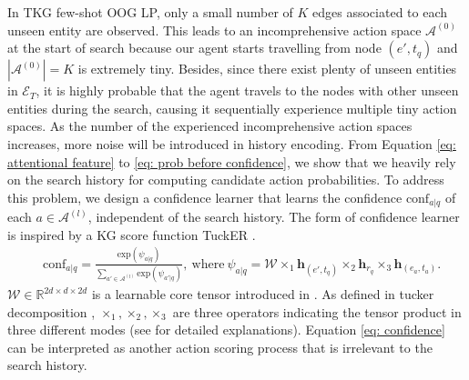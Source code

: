 \documentclass[runningheads]{llncs}
\begin{document}
In TKG few-shot OOG LP, only a small number of $K$ edges associated to each unseen entity are observed. 
This leads to an incomprehensive action space $\mathcal{A}^{(0)}$ at the start of search because our agent 
starts travelling from node $(e', t_q)$ and $|\mathcal{A}^{(0)}|=K$ is extremely tiny. 
Besides, since there exist plenty of unseen entities in $\mathcal{E}_T$, it is highly probable that the agent 
travels to the nodes with other unseen entities during the search, causing it sequentially experience multiple tiny action spaces. As the number of the experienced incomprehensive action spaces increases, more noise will be introduced in history encoding.
From Equation \ref{eq: attentional feature} to \ref{eq: prob before confidence}, 
we show that we heavily rely on the search history for computing candidate action probabilities.
To address this problem, we design a confidence learner that learns the confidence $\text{conf}_{a|q}$ of each
$a \in \mathcal{A}^{(l)}$, independent of the search history. The form of confidence learner is inspired by a KG score 
function TuckER \cite{DBLP:conf/emnlp/BalazevicAH19}.
\begin{equation}
\label{eq: confidence}
\begin{aligned}
        &\text{conf}_{a|q} = \frac{\text{exp}(\psi_{a|q})}{\sum_{a' \in \mathcal{A}^{(l)}} \text{exp}(\psi_{a'|q})}, \ \text{where}\ \psi_{a|q} = \mathcal{W} \times_1 \mathbf{h}_{(e', t_q)} \times_2 \mathbf{h}_{r_q} \times_3 \mathbf{h}_{(e_a, t_a)}.
\end{aligned}
\end{equation}
$\mathcal{W} \in \mathbb{R}^{2d \times d \times 2d}$ is a learnable core tensor introduced in \cite{DBLP:conf/emnlp/BalazevicAH19}. As defined in tucker decomposition \cite{tucker64extension}, $\times_1, \times_2, \times_3$ are three operators indicating the tensor product in three different modes (see \cite{DBLP:conf/emnlp/BalazevicAH19,tucker64extension} for detailed explanations). Equation \ref{eq: confidence} can be interpreted as another action scoring process that is irrelevant to the search history.
\end{document}
